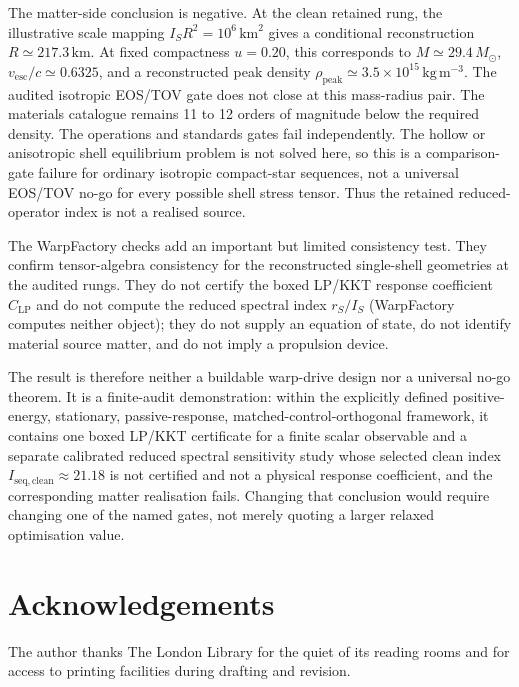 \documentclass[11pt,a4paper]{article}
\begin{document}
The matter-side conclusion is negative. At the clean retained rung, the illustrative scale mapping $I_{S}R^{2}=10^{6}\,\mathrm{km}^{2}$ gives a conditional reconstruction $R\simeq217.3\,\mathrm{km}$. At fixed compactness $u=0.20$, this corresponds to $M\simeq29.4\,M_{\odot}$, $v_{\mathrm{esc}}/c\simeq0.6325$, and a reconstructed peak density $\rho_{\mathrm{peak}}\simeq3.5\times10^{15}\,\mathrm{kg\,m^{-3}}$. The audited isotropic EOS/TOV gate does not close at this mass-radius pair. The materials catalogue remains 11 to 12 orders of magnitude below the required density. The operations and standards gates fail independently. The hollow or anisotropic shell equilibrium problem is not solved here, so this is a comparison-gate failure for ordinary isotropic compact-star sequences, not a universal EOS/TOV no-go for every possible shell stress tensor. Thus the retained reduced-operator index is not a realised source.

The WarpFactory checks add an important but limited consistency test. They confirm tensor-algebra consistency for the reconstructed single-shell geometries at the audited rungs. They do not certify the boxed LP/KKT response coefficient $C_{\mathrm{LP}}$ and do not compute the reduced spectral index $r_{S}/I_{S}$ (WarpFactory computes neither object); they do not supply an equation of state, do not identify material source matter, and do not imply a propulsion device.

The result is therefore neither a buildable warp-drive design nor a universal no-go theorem. It is a finite-audit demonstration: within the explicitly defined positive-energy, stationary, passive-response, matched-control-orthogonal framework, it contains one boxed LP/KKT certificate for a finite scalar observable and a separate calibrated reduced spectral sensitivity study whose selected clean index $I_{\mathrm{seq,clean}}\approx21.18$ is not certified and not a physical response coefficient, and the corresponding matter realisation fails. Changing that conclusion would require changing one of the named gates, not merely quoting a larger relaxed optimisation value.

\section*{Acknowledgements}

The author thanks The London Library for the quiet of its reading rooms and for access to printing facilities during drafting and revision.
\end{document}
